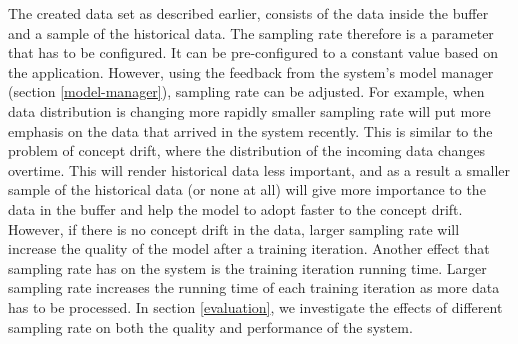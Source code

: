 \documentclass{sig-alternate-05-2015}
\begin{document}
The created data set as described earlier, consists of the data inside the buffer and a sample of the historical data.
The sampling rate therefore is a parameter that has to be configured.
It can be pre-configured to a constant value based on the application.
However, using the feedback from the system's model manager (section \ref{model-manager}), sampling rate can be adjusted.
For example, when data distribution is changing more rapidly smaller sampling rate will put more emphasis on the data that arrived in the system recently. 
This is similar to the problem of concept drift, where the distribution of the incoming data changes overtime.
This will render historical data less important, and as a result a smaller sample of the historical data (or none at all) will give more importance to the data in the buffer and help the model to adopt faster to the concept drift.
However, if there is no concept drift in the data, larger sampling rate will increase the quality of the model after a training iteration.
Another effect that sampling rate has on the system is the training iteration running time.
Larger sampling rate increases the running time of each training iteration as more data has to be processed.
In section \ref{evaluation}, we investigate the effects of different sampling rate on both the quality and performance of the system.
\end{document}
